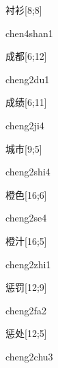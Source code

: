 \begin{verbete}{衬衫}[8;8]
\begin{pronuncia}{chen4shan1}
\end{pronuncia}
\end{verbete}

\begin{verbete}[cheng2du1]{成都}[6;12]
\begin{pronuncia}{cheng2du1}
\end{pronuncia}
\end{verbete}

\begin{verbete}[cheng2ji4]{成绩}[6;11]
\begin{pronuncia}{cheng2ji4}
\end{pronuncia}
\end{verbete}

\begin{verbete}{城市}[9;5]
\begin{pronuncia}{cheng2shi4}
\end{pronuncia}
\end{verbete}

\begin{verbete}[cheng2se4]{橙色}[16;6]
\begin{pronuncia}{cheng2se4}
\end{pronuncia}
\end{verbete}

\begin{verbete}{橙汁}[16;5]
\begin{pronuncia}{cheng2zhi1}
\end{pronuncia}
\end{verbete}

\begin{verbete}[cheng2fa2]{惩罚}[12;9]
\begin{pronuncia}{cheng2fa2}
\end{pronuncia}
\end{verbete}

\begin{verbete}{惩处}[12;5]
\begin{pronuncia}{cheng2chu3}
\end{pronuncia}
\end{verbete}

